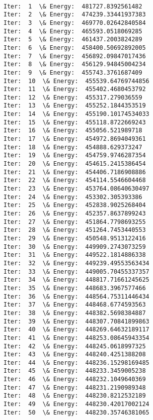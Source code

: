 \documentclass[11pt]{article}
\begin{document}
    \begin{center}
    \end{center}
    { \hspace*{\fill} \\}
    
    \begin{Verbatim}[commandchars=\\\{\}]
Iter:  1  \& Energy:  481727.8392561482
Iter:  2  \& Energy:  474239.33441937383
Iter:  3  \& Energy:  469770.02642840584
Iter:  4  \& Energy:  465593.0518069285
Iter:  5  \& Energy:  461437.2003824289
Iter:  6  \& Energy:  458400.50692892005
Iter:  7  \& Energy:  456892.09847017436
Iter:  8  \& Energy:  456129.94845004234
Iter:  9  \& Energy:  455743.3761687409
Iter:  10  \& Energy:  455539.64769744856
Iter:  11  \& Energy:  455402.4680453792
Iter:  12  \& Energy:  455317.279036559
Iter:  13  \& Energy:  455252.1844353519
Iter:  14  \& Energy:  455190.10174534033
Iter:  15  \& Energy:  455118.8722669243
Iter:  16  \& Energy:  455056.521989718
Iter:  17  \& Energy:  454972.8694049361
Iter:  18  \& Energy:  454888.629373247
Iter:  19  \& Energy:  454759.9746287354
Iter:  20  \& Energy:  454615.2415386454
Iter:  21  \& Energy:  454406.7186908886
Iter:  22  \& Energy:  454114.5546604468
Iter:  23  \& Energy:  453764.08640630497
Iter:  24  \& Energy:  453302.305393386
Iter:  25  \& Energy:  452838.9025268404
Iter:  26  \& Energy:  452357.8637899243
Iter:  27  \& Energy:  451864.7798693255
Iter:  28  \& Energy:  451264.7453440553
Iter:  29  \& Energy:  450548.9513122416
Iter:  30  \& Energy:  449909.2743073259
Iter:  31  \& Energy:  449522.1814886338
Iter:  32  \& Energy:  449239.49553563434
Iter:  33  \& Energy:  449005.70455337357
Iter:  34  \& Energy:  448817.71661245625
Iter:  35  \& Energy:  448683.3967577466
Iter:  36  \& Energy:  448564.75311446434
Iter:  37  \& Energy:  448468.6774593563
Iter:  38  \& Energy:  448382.5698384887
Iter:  39  \& Energy:  448307.70841899863
Iter:  40  \& Energy:  448269.64632189117
Iter:  41  \& Energy:  448253.08645943354
Iter:  42  \& Energy:  448245.0618997325
Iter:  43  \& Energy:  448240.4251388208
Iter:  44  \& Energy:  448236.15298169485
Iter:  45  \& Energy:  448233.3459005238
Iter:  46  \& Energy:  448232.1049640369
Iter:  47  \& Energy:  448231.2190989348
Iter:  48  \& Energy:  448230.8212532189
Iter:  49  \& Energy:  448230.42017002124
Iter:  50  \& Energy:  448230.35746381065

    \end{Verbatim}
\end{document}
